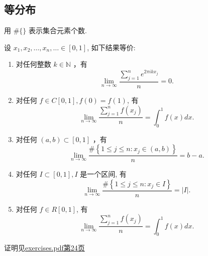 \subsection{等分布}

\begin{theorem}[Weyl等分布定理]\label{Weyl等分布定理}
    用 $\#\{\}$ 表示集合元素个数.

    设 $x_1, x_2, \ldots, x_n, \ldots \in[0,1]$, 如下结果等价:
    \begin{enumerate}
        \item 对任何整数 $k \in \mathbb{N}$ ，有
              $$
                  \lim _{n \rightarrow \infty} \frac{\sum_{j=1}^n e^{2 \pi i k x_j}}{n}=0 .
              $$
        \item 对任何 $f \in C[0,1], f(0)=f(1)$, 有
              $$
                  \lim _{n \rightarrow \infty} \frac{\sum_{j=1}^n f\left(x_j\right)}{n}=\int_0^1 f(x) d x .
              $$
        \item 对任何 $(a, b) \subset[0,1]$ ，有
              $$
                  \lim _{n \rightarrow \infty} \frac{\#\left\{1 \leqslant j \leqslant n: x_j \in(a, b)\right\}}{n}=b-a .
              $$
        \item 对任何 $I \subset[0,1], I$ 是一个区间, 有
              $$
                  \lim _{n \rightarrow \infty} \frac{\#\left\{1 \leqslant j \leqslant n: x_j \in I\right\}}{n}=|I| .
              $$
        \item 对任何 $f \in R[0,1]$, 有
              $$
                  \lim _{n \rightarrow \infty} \frac{\sum_{j=1}^n f\left(x_j\right)}{n}=\int_0^1 f(x) d x .
              $$
    \end{enumerate}
\end{theorem}

\begin{note}
    证明见\href{https://easygl1der.github.io/MyWebsite/Book/exercises.pdf#page=24}{exercises.pdf第24页}
\end{note}

